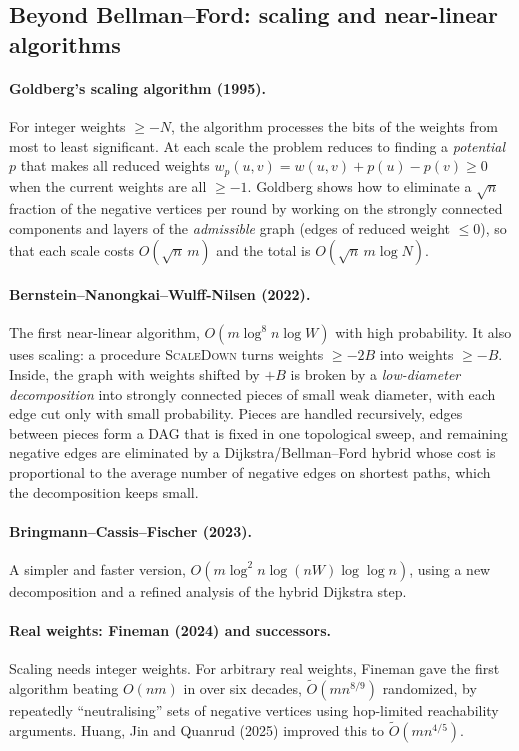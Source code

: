 \documentclass[11pt,a4paper]{article}
\theoremstyle{definition}
\newcommand{\Ot}{\tilde{O}}
\begin{document}
\subsection{Beyond Bellman--Ford: scaling and near-linear algorithms}
\label{sec:modern}

\paragraph{Goldberg's scaling algorithm (1995).} For integer weights $\ge -N$, the algorithm processes the bits of the weights from most to least significant. At each scale the problem reduces to finding a \emph{potential} $p$ that makes all reduced weights $w_p(u,v)=w(u,v)+p(u)-p(v)\ge 0$ when the current weights are all $\ge -1$. Goldberg shows how to eliminate a $\sqrt n$ fraction of the negative vertices per round by working on the strongly connected components and layers of the \emph{admissible} graph (edges of reduced weight $\le 0$), so that each scale costs $O(\sqrt n\, m)$ and the total is $O(\sqrt n\, m\log N)$.

\paragraph{Bernstein--Nanongkai--Wulff-Nilsen (2022).} The first near-linear algorithm, $O(m\log^8 n\log W)$ with high probability. It also uses scaling: a procedure \textsc{ScaleDown} turns weights $\ge -2B$ into weights $\ge -B$. Inside, the graph with weights shifted by $+B$ is broken by a \emph{low-diameter decomposition} into strongly connected pieces of small weak diameter, with each edge cut only with small probability. Pieces are handled recursively, edges between pieces form a DAG that is fixed in one topological sweep, and remaining negative edges are eliminated by a Dijkstra/Bellman--Ford hybrid whose cost is proportional to the average number of negative edges on shortest paths, which the decomposition keeps small.

\paragraph{Bringmann--Cassis--Fischer (2023).} A simpler and faster version, $O(m\log^2 n\log(nW)\log\log n)$, using a new decomposition and a refined analysis of the hybrid Dijkstra step.

\paragraph{Real weights: Fineman (2024) and successors.} Scaling needs integer weights. For arbitrary real weights, Fineman gave the first algorithm beating $O(nm)$ in over six decades, $\Ot(mn^{8/9})$ randomized, by repeatedly ``neutralising'' sets of negative vertices using hop-limited reachability arguments. Huang, Jin and Quanrud (2025) improved this to $\Ot(mn^{4/5})$.
\end{document}
